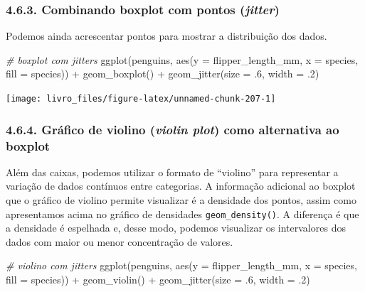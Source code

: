 \documentclass[
]{book}
\newenvironment{Shaded}{\begin{snugshade}}{\end{snugshade}}
\newcommand{\AttributeTok}[1]{\textcolor[rgb]{0.61,0.61,0.61}{#1}}
\newcommand{\CommentTok}[1]{\textcolor[rgb]{0.37,0.37,0.37}{\textit{#1}}}
\newcommand{\DecValTok}[1]{\textcolor[rgb]{0.06,0.06,0.06}{#1}}
\newcommand{\FunctionTok}[1]{\textcolor[rgb]{0,0,0}{#1}}
\newcommand{\NormalTok}[1]{#1}
\newcommand{\SpecialCharTok}[1]{\textcolor[rgb]{0,0,0}{#1}}
\begin{document}
\hypertarget{combinando-boxplot-com-pontos-jitter}{%
\subsubsection{\texorpdfstring{4.6.3. Combinando boxplot com pontos (\emph{jitter})}{4.6.3. Combinando boxplot com pontos (jitter)}}\label{combinando-boxplot-com-pontos-jitter}}

Podemos ainda acrescentar pontos para mostrar a distribuição dos dados.

\begin{Shaded}
\begin{Highlighting}[]
\CommentTok{\# boxplot com jitters}
\FunctionTok{ggplot}\NormalTok{(penguins, }
       \FunctionTok{aes}\NormalTok{(}\AttributeTok{y =}\NormalTok{ flipper\_length\_mm, }\AttributeTok{x =}\NormalTok{ species, }\AttributeTok{fill =}\NormalTok{ species)) }\SpecialCharTok{+}
  \FunctionTok{geom\_boxplot}\NormalTok{() }\SpecialCharTok{+}
  \FunctionTok{geom\_jitter}\NormalTok{(}\AttributeTok{size =}\NormalTok{ .}\DecValTok{6}\NormalTok{, }\AttributeTok{width =}\NormalTok{ .}\DecValTok{2}\NormalTok{)}
\end{Highlighting}
\end{Shaded}

\begin{center}\texttt{[image: livro\_files/figure-latex/unnamed-chunk-207-1]} \end{center}

\hypertarget{gruxe1fico-de-violino-violin-plot-como-alternativa-ao-boxplot}{%
\subsubsection{\texorpdfstring{4.6.4. Gráfico de violino (\emph{violin plot}) como alternativa ao boxplot}{4.6.4. Gráfico de violino (violin plot) como alternativa ao boxplot}}\label{gruxe1fico-de-violino-violin-plot-como-alternativa-ao-boxplot}}

Além das caixas, podemos utilizar o formato de ``violino'' para representar a variação de dados contínuos entre categorias. A informação adicional ao boxplot que o gráfico de violino permite visualizar é a densidade dos pontos, assim como apresentamos acima no gráfico de densidades \texttt{geom\_density()}. A diferença é que a densidade é espelhada e, desse modo, podemos visualizar os intervalores dos dados com maior ou menor concentração de valores.

\begin{Shaded}
\begin{Highlighting}[]
\CommentTok{\# violino com jitters}
\FunctionTok{ggplot}\NormalTok{(penguins, }\FunctionTok{aes}\NormalTok{(}\AttributeTok{y =}\NormalTok{ flipper\_length\_mm, }\AttributeTok{x =}\NormalTok{ species, }\AttributeTok{fill =}\NormalTok{ species)) }\SpecialCharTok{+}
  \FunctionTok{geom\_violin}\NormalTok{() }\SpecialCharTok{+}
  \FunctionTok{geom\_jitter}\NormalTok{(}\AttributeTok{size =}\NormalTok{ .}\DecValTok{6}\NormalTok{, }\AttributeTok{width =}\NormalTok{ .}\DecValTok{2}\NormalTok{)}
\end{Highlighting}
\end{Shaded}
\end{document}
